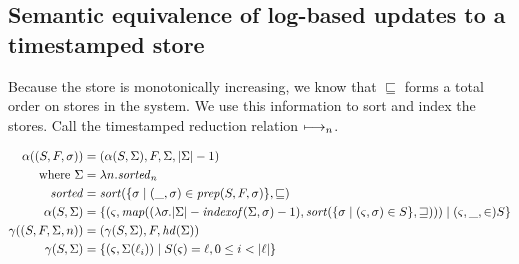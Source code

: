 \documentclass{llncs}
\begin{document}
\subsection{Semantic equivalence of log-based updates to a timestamped store}

Because the store is monotonically increasing, we know that
$\sqsubseteq$ forms a total order on stores in the system. We use this
information to sort and index the stores. Call the timestamped reduction relation $\mathbin{\longmapsto_n}$.

\begin{align*}
\alpha((S,F,\sigma)) &= (\alpha(S,\Sigma), F, \Sigma, |\Sigma|-1) \\
\text{ where } \Sigma &= \lambda n. \mathit{sorted}_n \\
               \mathit{sorted} &= \mathit{sort}(\{\sigma \mid (\_, \sigma) \in \mathit{prep}(S,F,\sigma)\},\sqsubseteq) \\
\alpha(S,\Sigma) &=
   \{(\varsigma, \mathit{map}((\lambda\sigma.|\Sigma|-\mathit{indexof}(\Sigma,\sigma)-1),\mathit{sort}(\{\sigma \mid (\varsigma, \sigma) \in S\}, \sqsupseteq)))
           \mid (\varsigma,\_, \in) S\} \\
\gamma((S,F,\Sigma,n)) &= (\gamma(S,\Sigma), F, \mathit{hd}(\Sigma)) \\
\gamma(S,\Sigma) &= \{(\varsigma, \Sigma(\ell_i)) \mid S(\varsigma) = \ell, 0 \le i < |\ell|\}
\end{align*}

\end{document}
